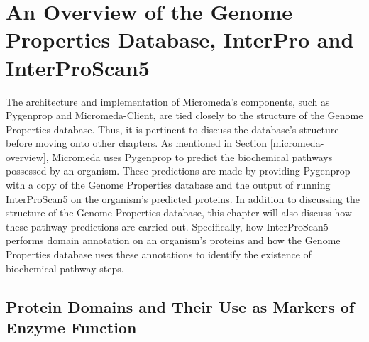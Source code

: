 \chapter{An Overview of the Genome Properties Database, InterPro and InterProScan5} \label{genome-properties} 

The architecture and implementation of Micromeda's components, such as Pygenprop and Micromeda-Client, are tied closely to the structure of the Genome Properties database. Thus, it is pertinent to discuss the database's structure before moving onto other chapters. As mentioned in Section \ref{micromeda-overview}, Micromeda uses Pygenprop to predict the biochemical pathways possessed by an organism. These predictions are made by providing Pygenprop with a copy of the Genome Properties database and the output of running InterProScan5 on the organism's predicted proteins. In addition to discussing the structure of the Genome Properties database, this chapter will also discuss how these pathway predictions are carried out. Specifically, how InterProScan5 performs domain annotation on an organism's proteins and how the Genome Properties database uses these annotations to identify the existence of biochemical pathway steps.

\section{Protein Domains and Their Use as Markers of Enzyme Function}

